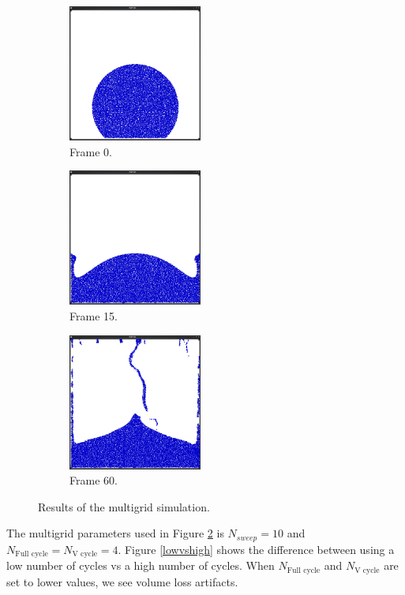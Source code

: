 \begin{figure}[ht!]
\centering

\begin{subfigure}[]{0.3\textwidth}
\includegraphics[height=45mm]{png/multigrid0.png}
\caption{Frame 0.}
\label{initialshapae}

\end{subfigure}
\begin{subfigure}[]{0.3\textwidth}
\includegraphics[height=45mm]{png/multigrid1.png}
\caption{Frame 15.}
\end{subfigure}

\begin{subfigure}[]{0.3\textwidth}
\includegraphics[height=45mm]{png/multigrid4.png}
\caption{Frame 60.}
\end{subfigure}

\caption{Results of the multigrid simulation.}
\label{simresult}
\end{figure}

The multigrid parameters used in Figure \ref{simresult} is $N_{sweep} = 10$ and $N_{\text{Full cycle}} = N_\text{V cycle} = 4$. Figure \ref{lowvshigh} shows the difference between using a low number of cycles vs a high number of cycles. When $N_{\text{Full cycle}}$ and $N_\text{V cycle}$ are set to lower values, we see volume loss artifacts.

